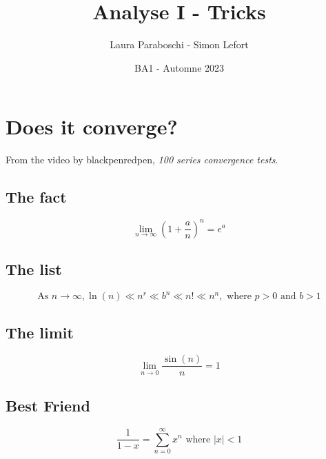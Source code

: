 \documentclass{article}
\title{Analyse I - Tricks}
\author{Laura Paraboschi - Simon Lefort}
\date{BA1 - Automne 2023}
\begin{document}
\maketitle

\section{Does it converge?}

From the video by blackpenredpen, \textit{100 series convergence tests}.

\subsection{The fact}
\[\lim_{n \to \infty} \left(1 + \frac{a}{n}\right)^n = e^a\]
\subsection{The list}
\[ \text{As } n \to \infty, \ln(n) \ll n^r \ll b^n \ll n! \ll n^n , \text{ where } p > 0 \text{ and } b > 1 \]
\subsection{The limit}
\[ \lim_{n \to 0} \frac{\sin(n)}{n} = 1\]
\subsection{Best Friend}
\[ \frac{1}{1 - x} = \sum_{n=0}^{\infty} x^n \text{ where } |x| < 1 \]
\end{document}
